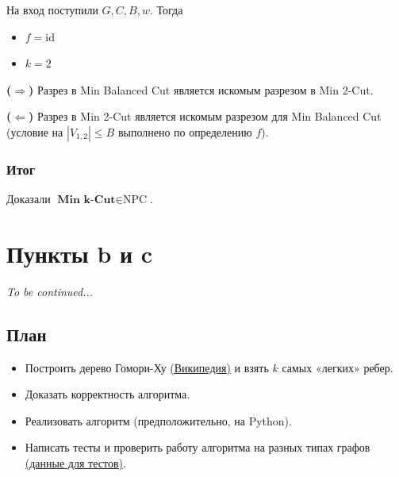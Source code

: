 \documentclass[12pt,a4paper]{article}
\begin{document}
На вход поступили $G, C, B, w$. Тогда
\begin{itemize}
    \item $f = \text{id}$
    \item $k = 2$
\end{itemize}

\textbf{($\Rightarrow$)} Разрез в Min Balanced Cut является искомым разрезом в Min 2-Cut.

\textbf{($\Leftarrow$)} Разрез в Min 2-Cut является искомым разрезом для Min Balanced Cut (условие на $|V_{1,2}| \le B$ выполнено по определению $f$).

\subsubsection*{Итог}
Доказали $\textbf{Min k-Cut} \in \text{NPC}$.

\section*{Пункты b и c}
\textit{To be continued...}

\subsection*{План}
\begin{itemize}
    \item Построить дерево Гомори-Ху \href{https://ru.wikipedia.org/wiki/Наименьший\_k-разрез}{(Википедия)} и взять $k$ самых «легких» ребер.
    \item Доказать корректность алгоритма.
    \item Реализовать алгоритм (предположительно, на Python).
    \item Написать тесты и проверить работу алгоритма на разных типах графов \href{http://users.cecs.anu.edu.au/~bdm/data/graphs.html}{(данные для тестов)}.
\end{itemize}
\end{document}
